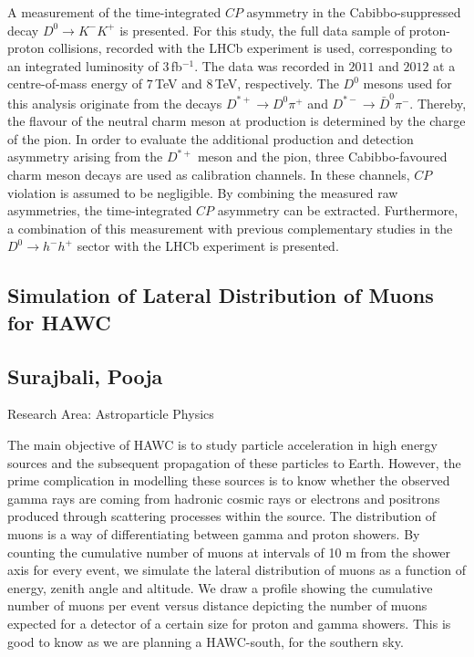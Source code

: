 \noindent A measurement of the time-integrated $CP$ asymmetry in the Cabibbo-suppressed decay $D^0\rightarrow K^-K^+$ is presented. For this study, the full data sample of proton-proton collisions, recorded with the LHCb experiment is used, corresponding to an integrated luminosity of $3\,$fb$^{-1}$. The data was recorded in $2011$ and $2012$ at a centre-of-mass energy of $7\,$TeV and $8\,$TeV, respectively. The $D^0$ mesons used for this analysis originate from the decays $D^{*+}\rightarrow D^0\pi^+$ and $D^{*-}\rightarrow \bar{D}^0\pi^-$. Thereby, the flavour of the neutral charm meson at production is determined by the charge of the pion. In order to evaluate the additional production and detection asymmetry arising from the $D^{*+}$ meson and the pion, three Cabibbo-favoured charm meson decays are used as calibration channels. In these channels, $CP$ violation is assumed to be negligible. By combining the measured raw asymmetries, the time-integrated $CP$ asymmetry can be extracted. Furthermore, a combination of this measurement with previous complementary studies in the $D^0\rightarrow h^-h^+$ sector with the LHCb experiment is presented.
\newpage

\subsection*{\centering \large Simulation of Lateral Distribution of Muons for HAWC}
\subsection*{\centering \normalsize Surajbali, Pooja}
Research Area: Astroparticle Physics\newline

\noindent The main objective of HAWC is to study particle acceleration in high energy sources and the subsequent propagation of these particles to Earth. However, the prime complication in modelling these sources is to know whether the observed gamma rays are coming from hadronic cosmic rays or electrons and positrons produced through scattering processes within the source. The distribution of muons is a way of differentiating between gamma and proton showers. By counting the cumulative number of muons at intervals of 10 m from the shower axis for every event, we simulate the lateral distribution of muons as a function of energy, zenith angle and altitude. We draw a profile showing the cumulative number of muons per event versus distance depicting the number of muons expected for a detector of a certain size for proton and gamma showers. This is good to know as we are planning a HAWC-south, for the southern sky.

